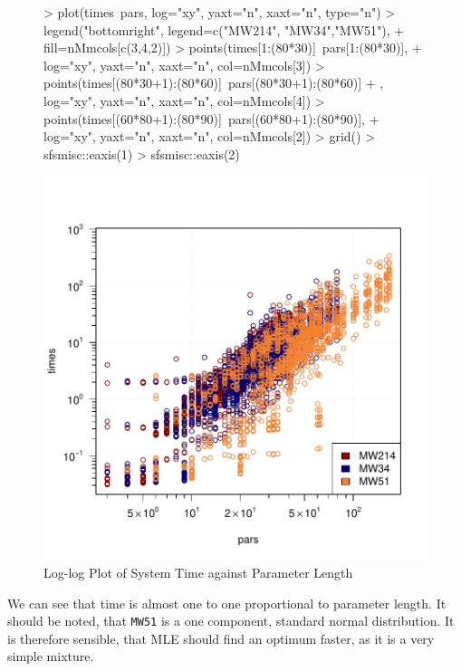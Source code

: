 \begin{figure}[h!]
    \centering
\begin{Schunk}
\begin{Sinput}
>     plot(times~pars, log="xy", yaxt="n", xaxt="n", type="n")
>     legend("bottomright", legend=c("MW214", "MW34","MW51"),
+            fill=nMmcols[c(3,4,2)])
>     points(times[1:(80*30)]~pars[1:(80*30)], 
+            log="xy", yaxt="n", xaxt="n", col=nMmcols[3])
>     points(times[(80*30+1):(80*60)]~pars[(80*30+1):(80*60)]
+            , log="xy", yaxt="n", xaxt="n", col=nMmcols[4])
>     points(times[(60*80+1):(80*90)]~pars[(60*80+1):(80*90)], 
+            log="xy", yaxt="n", xaxt="n", col=nMmcols[2])
>     grid()
>     sfsmisc::eaxis(1)
>     sfsmisc::eaxis(2)
\end{Sinput}
\end{Schunk}
\includegraphics{chapter3-figtime}
    \caption{Log-log Plot of System Time against Parameter Length}
    \label{fig:time}
\end{figure}

We can see that time is almost one to one proportional to parameter length.
It should be noted, that {\tt MW51} is a one component, standard normal 
distribution. It is therefore sensible, that MLE should find an optimum faster,
as it is a very simple mixture.


